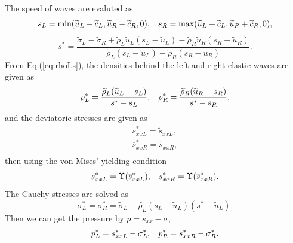 \documentclass{article}
\numberwithin{equation}{section}
\numberwithin{table}{section}
\begin{document}
The speed of waves are evaluted as
\begin{equation}
  s_L = \text{min} (\widetilde{u}_L-\widetilde{c}_L, \widetilde{u}_R-\widetilde{c}_R,0), \hspace{0.3cm} s_R = \text{max}(\widetilde{u}_L+\widetilde{c}_L, \widetilde{u}_R+\widetilde{c}_R,0),
	\end{equation}
	\begin{equation}
	  s^* = \frac{\widetilde{\sigma}_L-\widetilde{\sigma}_R+\widetilde{\rho}_L \widetilde{u}_L(s_L-\widetilde{u}_L)-\widetilde{\rho}_R \widetilde{u}_R(s_R-\widetilde{u}_R)}{\widetilde{\rho}_L(s_L-\widetilde{u}_L)-\widetilde{\rho}_R(s_R-\widetilde{u}_R)}.
\end{equation}
From  Eq.(\ref{eq:rhoLs}), the densities behind the left and right elastic  waves are given as
\begin{equation}
  \rho_L^* = \frac{\widetilde{\rho}_L(\widetilde{u}_L-s_L)}{s^*-s_L}, \hspace{0.3cm}  \rho_R^* = \frac{\widetilde{\rho}_R(\widetilde{u}_R-s_R)}{s^*-s_R},
\end{equation}
and the deviatoric stresses are  given as
  \begin{align}
  \overline{s}_{xxL}^* =  \widetilde{s}_{xxL},\\
  \overline{s}_{xxR}^* =  \widetilde{s}_{xxR},\\
\end{align}
then using  the von Mises' yielding condition
\begin{equation}
  s_{xxL}^* = \Upsilon(\overline{s}_{xxL}^*) , \hspace{0.3cm}  s_{xxR}^* = \Upsilon(\overline{s}_{xxR}^*).
\end{equation}
The Cauchy stresses  are solved as
\begin{equation}
  \sigma_L^*=\sigma_R^*=\widetilde{\sigma}_L -\widetilde{\rho_L} (s_L-\widetilde{u}_L)(s^*-\widetilde{u}_L).
\end{equation}
Then  we can get the pressure by $p =s_{xx}-\sigma$,
\begin{equation}
  p_L^* = s_{xxL}^* - \sigma_L^*, \hspace{0.3cm}   p_R^* = s_{xxR}^* - \sigma_R^*.
\end{equation}
\end{document}
